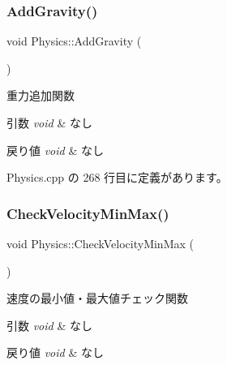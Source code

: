 \subsubsection{\texorpdfstring{Add\+Gravity()}{AddGravity()}}
{\footnotesize\ttfamily void Physics\+::\+Add\+Gravity (\begin{DoxyParamCaption}{ }\end{DoxyParamCaption})\hspace{0.3cm}{\ttfamily [private]}}



重力追加関数 


\begin{DoxyParams}{引数}
{\em void} & なし \\
\hline
\end{DoxyParams}

\begin{DoxyRetVals}{戻り値}
{\em void} & なし \\
\hline
\end{DoxyRetVals}


 Physics.\+cpp の 268 行目に定義があります。

\mbox{\label{class_physics_af6ad00988f0aa878285b930121d4748c}} 
\subsubsection{\texorpdfstring{Check\+Velocity\+Min\+Max()}{CheckVelocityMinMax()}}
{\footnotesize\ttfamily void Physics\+::\+Check\+Velocity\+Min\+Max (\begin{DoxyParamCaption}{ }\end{DoxyParamCaption})\hspace{0.3cm}{\ttfamily [private]}}



速度の最小値・最大値チェック関数 


\begin{DoxyParams}{引数}
{\em void} & なし \\
\hline
\end{DoxyParams}

\begin{DoxyRetVals}{戻り値}
{\em void} & なし \\
\hline
\end{DoxyRetVals}


